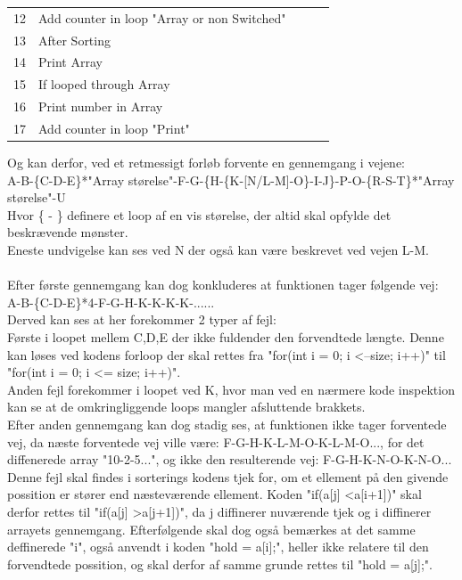 \documentclass[11pt]{article}
\begin{document}
\begin{table}[H]
\begin{minipage}{.3\textwidth}
\begin{tabular}{lllll}
                12 & Add counter in loop "Array or non Switched"\\
                13 & After Sorting\\
                14 & Print Array\\
                15 & If looped through Array\\
                16 & Print number in Array\\
                17 & Add counter in loop "Print"\\
            \end{tabular}
        \end{minipage}
    \end{table}
    \noindent
    Og kan derfor, ved et retmessigt forløb forvente en gennemgang i vejene:\\
    A-B-\{C-D-E\}*"Array størelse"-F-G-\{H-\{K-[N/L-M]-O\}-I-J\}-P-O-\{R-S-T\}*"Array størelse"-U\\
    Hvor \{ - \} definere et loop af en vis størelse, der altid skal opfylde det beskrævende mønster.\\
    Eneste undvigelse kan ses ved N der også kan være beskrevet ved vejen L-M.\\
    \\
    Efter første gennemgang kan dog konkluderes at funktionen tager følgende vej:\\
    A-B-\{C-D-E\}*4-F-G-H-K-K-K-K-......\\
    Derved kan ses at her forekommer 2 typer af fejl:\\
    Første i loopet mellem C,D,E der ikke fuldender den forvendtede længte. Denne kan løses ved kodens forloop der skal rettes fra "for(int i = 0; i \textless --size; i++)" til "for(int i = 0; i \textless= size; i++)".\\
    Anden fejl forekommer i loopet ved K, hvor man ved en nærmere kode inspektion kan se at de omkringliggende loops mangler afsluttende brakkets.\\
    Efter anden gennemgang kan dog stadig ses, at funktionen ikke tager forventede vej, da næste forventede vej ville være: F-G-H-K-L-M-O-K-L-M-O..., for det diffenerede array "10-2-5...", og ikke den resulterende vej: F-G-H-K-N-O-K-N-O...\\
    Denne fejl skal findes i sorterings kodens tjek for, om et ellement på den givende possition er stører end næsteværende ellement. Koden "if(a[j] \textless a[i+1])" skal derfor rettes til "if(a[j] \textgreater a[j+1])", da j diffinerer nuværende tjek og i diffinerer arrayets gennemgang. Efterfølgende skal dog også bemærkes at det samme deffinerede "i", også anvendt i koden "hold = a[i];", heller ikke relatere til den forvendtede possition, og skal derfor af samme grunde rettes til "hold = a[j];".\\
\end{document}
